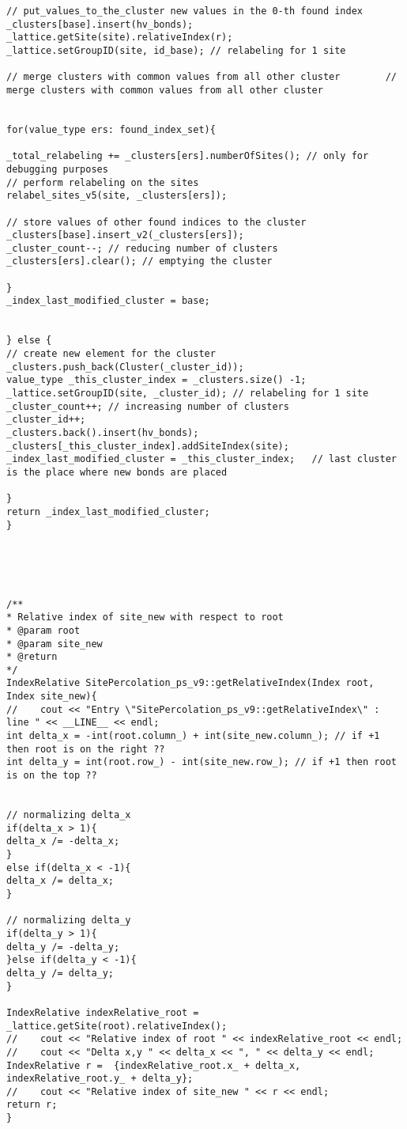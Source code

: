 \begin{lstlisting}[style=CStyle]
// put_values_to_the_cluster new values in the 0-th found index
_clusters[base].insert(hv_bonds);
_lattice.getSite(site).relativeIndex(r);
_lattice.setGroupID(site, id_base); // relabeling for 1 site

// merge clusters with common values from all other cluster        // merge clusters with common values from all other cluster


for(value_type ers: found_index_set){

_total_relabeling += _clusters[ers].numberOfSites(); // only for debugging purposes
// perform relabeling on the sites
relabel_sites_v5(site, _clusters[ers]);

// store values of other found indices to the cluster
_clusters[base].insert_v2(_clusters[ers]);
_cluster_count--; // reducing number of clusters
_clusters[ers].clear(); // emptying the cluster

}
_index_last_modified_cluster = base;


} else {
// create new element for the cluster
_clusters.push_back(Cluster(_cluster_id));
value_type _this_cluster_index = _clusters.size() -1;
_lattice.setGroupID(site, _cluster_id); // relabeling for 1 site
_cluster_count++; // increasing number of clusters
_cluster_id++;
_clusters.back().insert(hv_bonds);
_clusters[_this_cluster_index].addSiteIndex(site);
_index_last_modified_cluster = _this_cluster_index;   // last cluster is the place where new bonds are placed

}
return _index_last_modified_cluster;
}





/**
* Relative index of site_new with respect to root
* @param root
* @param site_new
* @return
*/
IndexRelative SitePercolation_ps_v9::getRelativeIndex(Index root, Index site_new){
//    cout << "Entry \"SitePercolation_ps_v9::getRelativeIndex\" : line " << __LINE__ << endl;
int delta_x = -int(root.column_) + int(site_new.column_); // if +1 then root is on the right ??
int delta_y = int(root.row_) - int(site_new.row_); // if +1 then root is on the top ??


// normalizing delta_x
if(delta_x > 1){
delta_x /= -delta_x;
}
else if(delta_x < -1){
delta_x /= delta_x;
}

// normalizing delta_y
if(delta_y > 1){
delta_y /= -delta_y;
}else if(delta_y < -1){
delta_y /= delta_y;
}

IndexRelative indexRelative_root = _lattice.getSite(root).relativeIndex();
//    cout << "Relative index of root " << indexRelative_root << endl;
//    cout << "Delta x,y " << delta_x << ", " << delta_y << endl;
IndexRelative r =  {indexRelative_root.x_ + delta_x, indexRelative_root.y_ + delta_y};
//    cout << "Relative index of site_new " << r << endl;
return r;
}




\end{lstlisting}
